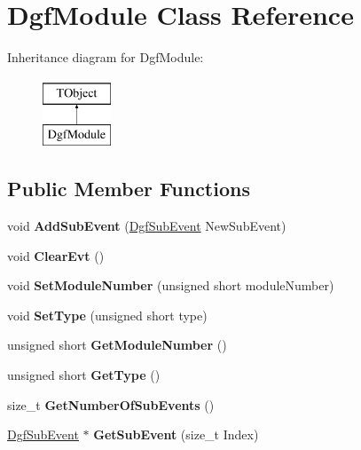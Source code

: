 \hypertarget{class_dgf_module}{}\section{Dgf\+Module Class Reference}
\label{class_dgf_module}
Inheritance diagram for Dgf\+Module\+:\begin{figure}[H]
\begin{center}
\leavevmode
\includegraphics[height=2.000000cm]{class_dgf_module}
\end{center}
\end{figure}
\subsection*{Public Member Functions}
\begin{DoxyCompactItemize}
\item 
\mbox{\label{class_dgf_module_a57667b7eedf5f736b575d32b29ec4ba3}} 
void {\bfseries Add\+Sub\+Event} (\hyperlink{class_dgf_sub_event}{Dgf\+Sub\+Event} New\+Sub\+Event)
\item 
\mbox{\label{class_dgf_module_a2723a18e784f5292ec9ba1f417e699a3}} 
void {\bfseries Clear\+Evt} ()
\item 
\mbox{\label{class_dgf_module_a44c6164a64dc7543c57fd1f399477b46}} 
void {\bfseries Set\+Module\+Number} (unsigned short module\+Number)
\item 
\mbox{\label{class_dgf_module_ad9577d76d5ca21546fdebce9f6183f9d}} 
void {\bfseries Set\+Type} (unsigned short type)
\item 
\mbox{\label{class_dgf_module_afa5b0d56e89f4427fb4facb338897d92}} 
unsigned short {\bfseries Get\+Module\+Number} ()
\item 
\mbox{\label{class_dgf_module_a338db9255ddcd3fcb58c9678561e9210}} 
unsigned short {\bfseries Get\+Type} ()
\item 
\mbox{\label{class_dgf_module_aecd2134604c63c0b962318f6e8f928c1}} 
size\+\_\+t {\bfseries Get\+Number\+Of\+Sub\+Events} ()
\item 
\mbox{\label{class_dgf_module_a398e1293245266eee289f004b3f14ca0}} 
\hyperlink{class_dgf_sub_event}{Dgf\+Sub\+Event} $\ast$ {\bfseries Get\+Sub\+Event} (size\+\_\+t Index)
\end{DoxyCompactItemize}
